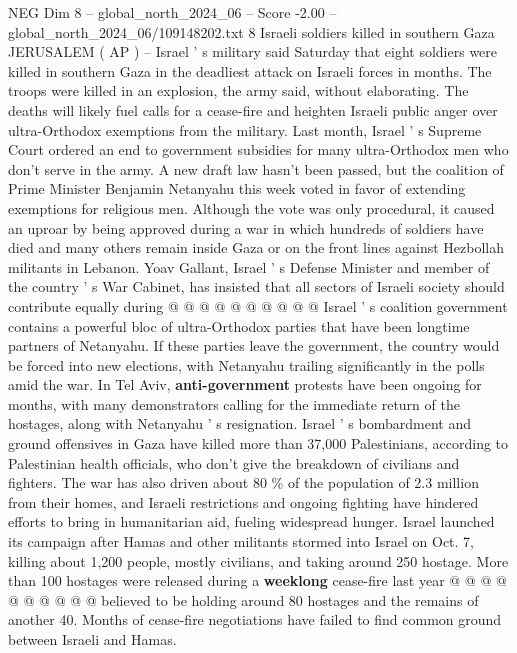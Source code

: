 \begin{textsample}{NEG Dim 8 – global\_north\_2024\_06 – Score -2.00 – global\_north\_2024\_06/109148202.txt}  \label{ex:f8_neg_190}
8 Israeli soldiers killed in southern Gaza JERUSALEM ( AP ) -- Israel ' s military said Saturday that eight soldiers were killed in southern Gaza in the deadliest attack on Israeli forces in months.
The troops were killed in an explosion, the army said, without elaborating.
The deaths will likely fuel calls for a cease-fire and heighten Israeli public anger over ultra-Orthodox exemptions from the military.
Last month, Israel ' s Supreme Court ordered an end to government subsidies for many ultra-Orthodox men who don't serve in the army.
A new draft law hasn't been passed, but the coalition of Prime Minister Benjamin Netanyahu this week voted in favor of extending exemptions for religious men.
Although the vote was only procedural, it caused an uproar by being approved during a war in which hundreds of soldiers have died and many others remain inside Gaza or on the front lines against Hezbollah militants in Lebanon.
Yoav Gallant, Israel ' s Defense Minister and member of the country ' s War Cabinet, has insisted that all sectors of Israeli society should contribute equally during @ @ @ @ @ @ @ @ @ @ Israel ' s coalition government contains a powerful bloc of ultra-Orthodox parties that have been longtime partners of Netanyahu.
If these parties leave the government, the country would be forced into new elections, with Netanyahu trailing significantly in the polls amid the war.
In Tel Aviv, \textbf{anti-government} protests have been ongoing for months, with many demonstrators calling for the immediate return of the hostages, along with Netanyahu ' s resignation.
Israel ' s bombardment and ground offensives in Gaza have killed more than 37,000 Palestinians, according to Palestinian health officials, who don't give the breakdown of civilians and fighters.
The war has also driven about 80 \% of the population of 2.3 million from their homes, and Israeli restrictions and ongoing fighting have hindered efforts to bring in humanitarian aid, fueling widespread hunger.
Israel launched its campaign after Hamas and other militants stormed into Israel on Oct. 7, killing about 1,200 people, mostly civilians, and taking around 250 hostage.
More than 100 hostages were released during a \textbf{weeklong} cease-fire last year @ @ @ @ @ @ @ @ @ @ believed to be holding around 80 hostages and the remains of another 40.
Months of cease-fire negotiations have failed to find common ground between Israeli and Hamas.

\end{textsample}

